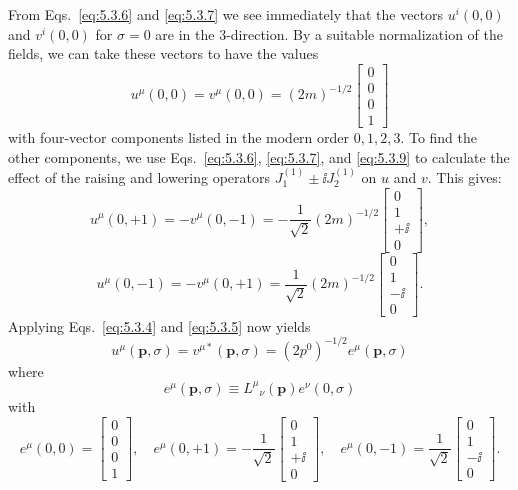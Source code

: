 From Eqs.~\eqref{eq:5.3.6} and \eqref{eq:5.3.7} we see immediately that the vectors
$u^i(0,0)$ and $v^i(0,0)$ for $\sigma=0$ are in the 3-direction. By a suitable
normalization of the fields, we can take these vectors to have the values
\begin{equation}
  u^\mu(0,0)=v^\mu(0,0)=(2m)^{-1/2}
  \begin{bmatrix}0\\0\\0\\1\end{bmatrix}
  \tag{5.3.20}\label{eq:5.3.20}
\end{equation}
with four-vector components listed in the modern order $0,1,2,3$. To find the
other components, we use Eqs.~\eqref{eq:5.3.6}, \eqref{eq:5.3.7}, and \eqref{eq:5.3.9} to calculate the
effect of the raising and lowering operators $J^{(1)}_1\pm \ii J^{(1)}_2$ on
$u$ and $v$. This gives:
\begin{equation}
  u^\mu(0,+1)=-v^\mu(0,-1)
  =-\frac{1}{\sqrt2}(2m)^{-1/2}
  \begin{bmatrix}0\\1\\+\ii\\0\end{bmatrix},
  \tag{5.3.21}\label{eq:5.3.21}
\end{equation}
\begin{equation}
  u^\mu(0,-1)=-v^\mu(0,+1)
  =\frac{1}{\sqrt2}(2m)^{-1/2}
  \begin{bmatrix}0\\1\\-\ii\\0\end{bmatrix}.
  \tag{5.3.22}\label{eq:5.3.22}
\end{equation}
Applying Eqs.~\eqref{eq:5.3.4} and \eqref{eq:5.3.5} now yields
\begin{equation}
  u^\mu(\mathbf{p},\sigma)=v^{\mu*}(\mathbf{p},\sigma)
  =(2p^0)^{-1/2}e^\mu(\mathbf{p},\sigma)
  \tag{5.3.23}\label{eq:5.3.23}
\end{equation}
where
\begin{equation}
  e^\mu(\mathbf{p},\sigma)\equiv L^\mu{}_{\nu}(\mathbf{p})e^\nu(0,\sigma)
  \tag{5.3.24}\label{eq:5.3.24}
\end{equation}
with
\begin{equation}
  e^\mu(0,0)=\begin{bmatrix}0\\0\\0\\1\end{bmatrix},\quad
  e^\mu(0,+1)=-\frac{1}{\sqrt2}
  \begin{bmatrix}0\\1\\+\ii\\0\end{bmatrix},\quad
  e^\mu(0,-1)=\frac{1}{\sqrt2}
  \begin{bmatrix}0\\1\\-\ii\\0\end{bmatrix}.
  \tag{5.3.25}\label{eq:5.3.25}
\end{equation}
